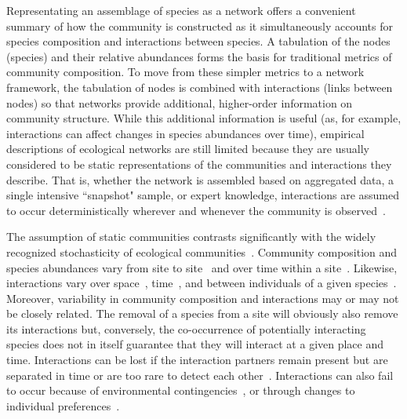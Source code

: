 \documentclass[12pt]{article}
\begin{document}
    Representating an assemblage of species as a network offers a convenient summary of how the community is constructed as it simultaneously accounts for species composition and interactions between species. A tabulation of the nodes (species) and their relative abundances forms the basis for traditional metrics of community composition. To move from these simpler metrics to a network framework, the tabulation of nodes is combined with interactions (links between nodes) so that networks provide additional, higher-order information on community structure. While this additional information is useful (as, for example, interactions can affect changes in species abundances over time), empirical descriptions of ecological networks are still limited because they are usually considered to be static representations of the communities and interactions they describe. That is, whether the network is assembled based on aggregated data, a single intensive ``snapshot" sample, or expert knowledge, interactions are assumed to occur deterministically wherever and whenever the community is observed~\citep{Olesen2011a}. 


    The assumption of static communities contrasts significantly with the widely recognized stochasticity of ecological communities~\citep{Gotelli2000}. Community composition and species abundances vary from site to site~\citep{Baiser2012} and over time within a site~\citep{Olesen2011a}. Likewise, interactions vary over space~\citep{Kitching1987,Baiser2012}, time~\citep{Kitching1987,Olesen2011a}, and between individuals of a given species~\citep{Pires2011a,Fodrie2015,Novak2015}. Moreover, variability in community composition and interactions may or may not be closely related. The removal of a species from a site will obviously also remove its interactions but, conversely, the co-occurrence of potentially interacting species does not in itself guarantee that they will interact at a given place and time. Interactions can be lost if the interaction partners remain present but are separated in time or are too rare to detect each other~\citep{Tylianakis2010}. Interactions can also fail to occur because of environmental contingencies~\citep{Poisot2015}, or through changes to individual preferences~\citep{Fodrie2015}. 
\end{document}
